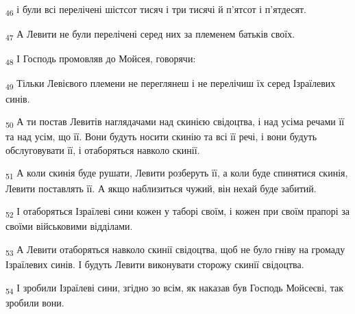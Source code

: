 \begin{tcolorbox}
\textsubscript{46} і були всі перелічені шістсот тисяч і три тисячі й п'ятсот і п'ятдесят.
\end{tcolorbox}
\begin{tcolorbox}
\textsubscript{47} А Левити не були перелічені серед них за племенем батьків своїх.
\end{tcolorbox}
\begin{tcolorbox}
\textsubscript{48} І Господь промовляв до Мойсея, говорячи:
\end{tcolorbox}
\begin{tcolorbox}
\textsubscript{49} Тільки Левієвого племени не переглянеш і не перелічиш їх серед Ізраїлевих синів.
\end{tcolorbox}
\begin{tcolorbox}
\textsubscript{50} А ти постав Левитів наглядачами над скинією свідоцтва, і над усіма речами її та над усім, що її. Вони будуть носити скинію та всі її речі, і вони будуть обслуговувати її, і отаборяться навколо скинії.
\end{tcolorbox}
\begin{tcolorbox}
\textsubscript{51} А коли скинія буде рушати, Левити розберуть її, а коли буде спинятися скинія, Левити поставлять її. А якщо наблизиться чужий, він нехай буде забитий.
\end{tcolorbox}
\begin{tcolorbox}
\textsubscript{52} І отаборяться Ізраїлеві сини кожен у таборі своїм, і кожен при своїм прапорі за своїми військовими відділами.
\end{tcolorbox}
\begin{tcolorbox}
\textsubscript{53} А Левити отаборяться навколо скинії свідоцтва, щоб не було гніву на громаду Ізраїлевих синів. І будуть Левити виконувати сторожу скинії свідоцтва.
\end{tcolorbox}
\begin{tcolorbox}
\textsubscript{54} І зробили Ізраїлеві сини, згідно зо всім, як наказав був Господь Мойсеєві, так зробили вони.
\end{tcolorbox}
